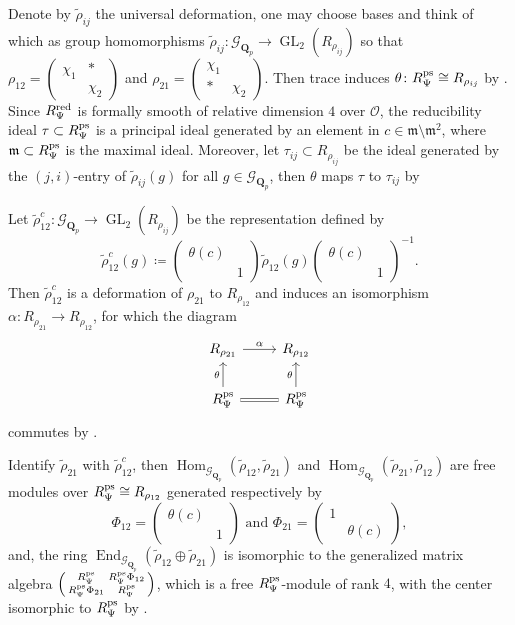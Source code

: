 \documentclass[leqno]{amsart}
\newcommand{\smat}[1]{\left( \begin{smallmatrix} #1 \end{smallmatrix} \right)}
\newcommand{\Gp}{\mathcal{G}_{\Qp}} %
\newcommand{\ps}{\textnormal{ps}}
\newcommand{\red}{\textnormal{red}}
\DeclareMathOperator{\GL}{GL}
\newcommand{\Qp}{\mathbf{Q}_p}
\newcommand{\oo}{\mathcal{O}} %
\newcommand{\fm}{\mathfrak{m}}
\DeclareMathOperator{\End}{End}
\DeclareMathOperator{\Hom}{Hom}
\theoremstyle{definition}
\theoremstyle{remark}
\begin{document}
Denote by $\tilde{\rho}_{ij}$ the universal deformation,
one may choose bases and think of which as group homomorphisms
$\tilde{\rho}_{ij}\colon \Gp\to \GL_2(R_{\rho_{ij}})$
so that 
$\rho_{12}=\smat{\chi_1&*\\&\chi_2}$ and
$\rho_{21}=\smat{\chi_1&\\ * &\chi_2}$.
Then trace induces $\theta\colon R_{\Psi}^{\ps}\cong R_{\rho_{ij}}$ by \cite[Prop B.17]{pask}.
Since $R^{\red}_{\Psi}$ is formally smooth of relative dimension $4$ over $\oo$,
the reducibility ideal  $\tau\subset R_{\Psi}^{\ps}$ is a principal ideal generated by 
an element in $c\in\fm\setminus \fm^2$,
where $\fm\subset R_{\Psi}^{\ps}$ is the maximal ideal. 
Moreover, let $\tau_{ij}\subset R_{\rho_{ij}} $ be the ideal 
generated by the $(j,i)$-entry of  $ \tilde{\rho}_{ij}(g)$
for all $g\in \Gp$,
then  $\theta$ maps  $\tau$ to  $\tau_{ij}$ by \cite[Prop B.23]{pask}

Let $\tilde{\rho}_{12}^c\colon \Gp\to \GL_2(R_{\rho_{ij}})$ be the representation defined by
\begin{equation*}
	\tilde{\rho}_{12}^c(g)\coloneqq 
	\smat{\theta(c)&\\&1}
	\tilde{\rho}_{12}(g)
	\smat{\theta(c)&\\&1}^{-1}.
\end{equation*}
Then $ \tilde{\rho}_{12}^c$ is a deformation of $\rho_{21}$ to $R_{\rho_{12}}$
and induces an isomorphism $\alpha\colon R_{\rho_{21}}\to R_{\rho_{12}}$,
for which the diagram
\begin{equation*}
	\begin{tikzcd}
		R_{\rho_{21}} \arrow[r,"\alpha"] &
		R_{\rho_{12}}\\
		R_{\Psi}^{\ps} \arrow[u,"\theta"] \arrow[r,equal] &
		R_{\Psi}^{\ps} \arrow[u,"\theta"]
	\end{tikzcd}
\end{equation*}
commutes by \cite[Prop B.24]{pask}.

Identify $\tilde{\rho}_{21}$ with $\tilde{\rho}_{12}^c$,
then
$\Hom_{\Gp}(\tilde{\rho}_{12}, \tilde{\rho}_{21})$ and
$\Hom_{\Gp}(\tilde{\rho}_{21}, \tilde{\rho}_{12})$
are free modules over $R_{\Psi}^{\ps}\cong R_{\rho_{12}}$ 
generated respectively by
\begin{equation}\label{eq:Phi_ij}
	\Phi_{12}=\smat{\theta(c)&\\&1} \text{ and }
	\Phi_{21}=\smat{1&\\&\theta(c)},
\end{equation}
and, the ring $\End_{\Gp}(\tilde{\rho}_{12}\oplus \tilde{\rho}_{21})$
is isomorphic to the generalized matrix algebra
$\smat{R_{\Psi}^{\ps}& R_{\Psi}^{\ps}\Phi_{12}\\ R_{\Psi}^{\ps}\Phi_{21}& R_{\Psi}^{\ps}}$,
which is a free $R_{\Psi}^{\ps}$-module of rank  $4$,
with the center isomorphic to  $R_{\Psi}^{\ps}$
by \cite[Prop B.26]{pask}.
\end{document}
